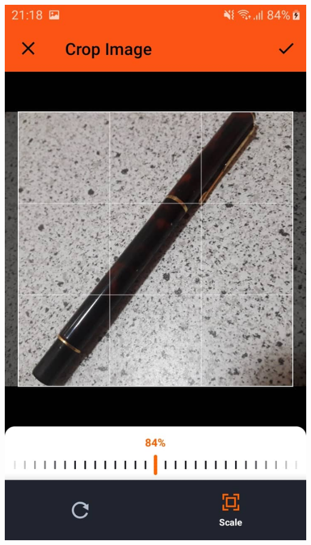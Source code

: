\documentclass{article}
\begin{document}
\begin{center}
	\includegraphics[scale=0.15]{photoAnd.jpg}

\end{center}
\end{document}
